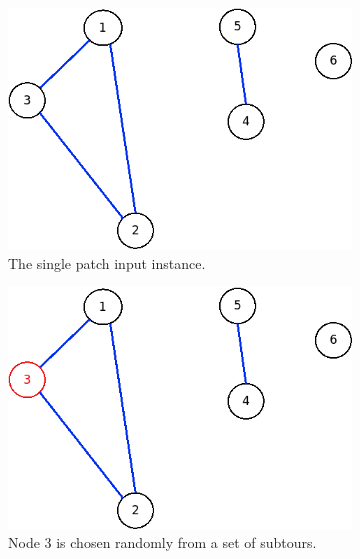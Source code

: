 \begin{figure}[!h]
	\begin{subfigure}{.26\columnwidth}
		\includegraphics[width=\columnwidth]{img/patching1.png}
		\caption{The single patch input instance.}
		\label{fig:patching1}
	\end{subfigure}
\hfill%
	\begin{subfigure}{.26\columnwidth}
		\includegraphics[width=\columnwidth]{img/patching2.png}
		\caption{Node $ 3 $ is chosen randomly from a set of subtours.}
		\label{fig:patching2}
	\end{subfigure}
\hfill%
	\begin{subfigure}{.26\columnwidth}

\end{subfigure}
\end{figure}
